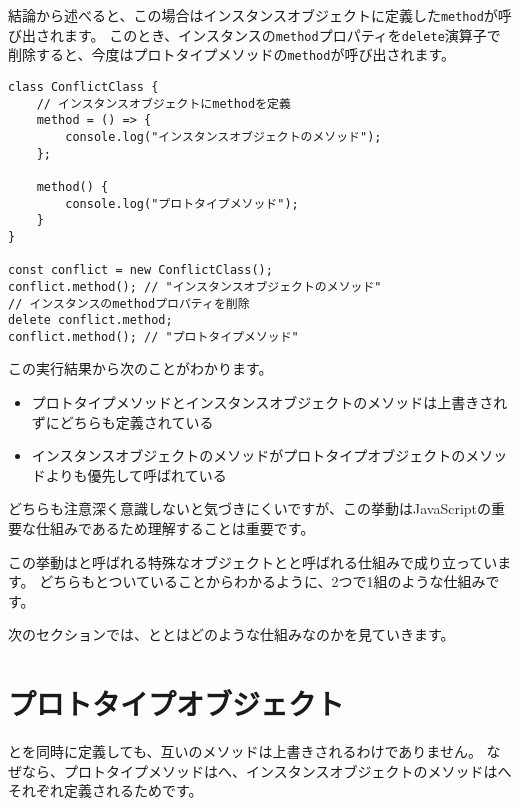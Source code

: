 結論から述べると、この場合はインスタンスオブジェクトに定義した\texttt{method}が呼び出されます。
このとき、インスタンスの\texttt{method}プロパティを\texttt{delete}演算子で削除すると、今度はプロトタイプメソッドの\texttt{method}が呼び出されます。

\begin{lstlisting}
class ConflictClass {
    // インスタンスオブジェクトにmethodを定義
    method = () => {
        console.log("インスタンスオブジェクトのメソッド");
    };

    method() {
        console.log("プロトタイプメソッド");
    }
}

const conflict = new ConflictClass();
conflict.method(); // "インスタンスオブジェクトのメソッド"
// インスタンスのmethodプロパティを削除
delete conflict.method;
conflict.method(); // "プロトタイプメソッド"
\end{lstlisting}

この実行結果から次のことがわかります。

\begin{itemize}
\item
  プロトタイプメソッドとインスタンスオブジェクトのメソッドは上書きされずにどちらも定義されている
\item
  インスタンスオブジェクトのメソッドがプロトタイプオブジェクトのメソッドよりも優先して呼ばれている
\end{itemize}

どちらも注意深く意識しないと気づきにくいですが、この挙動はJavaScriptの重要な仕組みであるため理解することは重要です。

この挙動は\textbf{}と呼ばれる特殊なオブジェクトと\textbf{}と呼ばれる仕組みで成り立っています。
どちらも\textbf{}とついていることからわかるように、2つで1組のような仕組みです。

次のセクションでは、\textbf{}と\textbf{}とはどのような仕組みなのかを見ていきます。

\hypertarget{prototype}{%
\section{プロトタイプオブジェクト}\label{prototype}}

\textbf{}と\textbf{}を同時に定義しても、互いのメソッドは上書きされるわけでありません。
なぜなら、プロトタイプメソッドは\textbf{}へ、インスタンスオブジェクトのメソッドは\textbf{}へそれぞれ定義されるためです。


